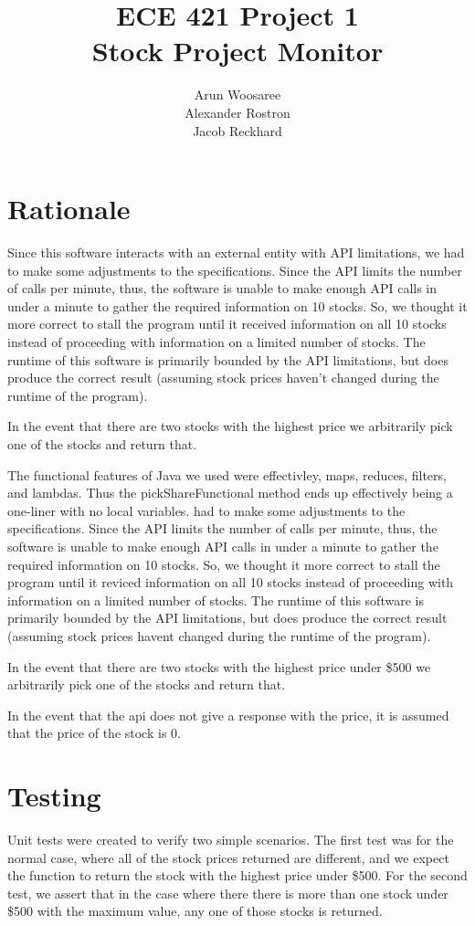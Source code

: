 \documentclass[letterpaper]{article}
\title{ECE 421 Project 1\\
Stock Project Monitor}
\author{Arun Woosaree\\
Alexander Rostron\\
Jacob Reckhard
}
\begin{document}
\maketitle %

\section{Rationale}
Since this software interacts with an external entity with API
limitations, we had to make some adjustments to the
specifications. Since the API limits the number of calls per minute,
thus, the software is unable to make enough API calls in under a
minute to gather the required information on 10 stocks. So, we thought
it more correct to stall the program until it received information on
all 10 stocks instead of proceeding with information on a limited
number of stocks. The runtime of this software is primarily bounded by
the API limitations, but does produce the correct result (assuming
stock prices haven't changed during the runtime of the program).

In the event that there are two stocks with the highest price we
arbitrarily pick one of the stocks and return that.

The functional features of Java we used were effectivley, maps,
reduces, filters, and lambdas. Thus the pickShareFunctional method
ends up effectively being a one-liner with no local variables.
had to make some adjustments to the specifications. Since the API limits the
number of calls per minute, thus, the software is unable to make enough API
calls in under a minute to gather the required information on 10 stocks. So,
we thought it more correct to stall the program until it reviced information
on all 10 stocks instead of proceeding with information on a limited number of
stocks. The runtime of this software is primarily bounded by the API
limitations, but does produce the correct result (assuming stock prices
havent changed during the runtime of the program).

In the event that there are two stocks with the highest price under \$500 we
arbitrarily pick one of the stocks and return that.

In the event that the api does not give a response with the price, it is assumed
that the price of the stock is 0.

\section{Testing}
Unit tests were created to verify two simple scenarios. The first test was for
the normal case, where all of the stock prices returned are different, and we
expect the function to return the stock with the highest price under \$500. For
the second test, we assert that in the case where there there is more than one
stock under \$500 with the maximum value, any one of those stocks is returned. 
\end{document}
